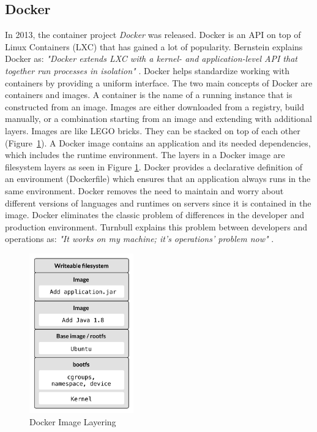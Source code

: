 \subsection*{Docker}
In 2013, the container project \textit{Docker} was released. Docker is an API on top of Linux Containers (LXC) that has gained a lot of popularity. Bernstein explains Docker as: \textit{"Docker extends LXC with a kernel- and application-level API that together run processes in isolation"} \cite[p. 82]{bernstein2014containers}. Docker helps standardize working with containers by providing a uniform interface. The two main concepts of Docker are containers and images. A container is the name of a running instance that is constructed from an image. Images are either downloaded from a registry, build manually, or a combination starting from an image and extending with additional layers. Images are like LEGO bricks. They can be stacked on top of each other (Figure~\ref{fig:docker_image}). A Docker image contains an application and its needed dependencies, which includes the runtime environment. The layers in a Docker image are filesystem layers as seen in Figure \ref{fig:docker_image}. Docker provides a declarative definition of an environment (Dockerfile) which ensures that an application always runs in the same environment. Docker removes the need to maintain and worry about different versions of languages and runtimes on servers since it is contained in the image. Docker eliminates the classic problem of differences in the developer and production environment. Turnbull explains this problem between developers and operations as: \textit{"It works on my machine; it's operations' problem now"} \cite[p. 103]{anderson2015docker}.

\begin{figure}[H]
    \centering
    \includegraphics[width=4.5cm]{figures/docker_image}
    \caption{Docker Image Layering}
    \label{fig:docker_image}
\end{figure}

